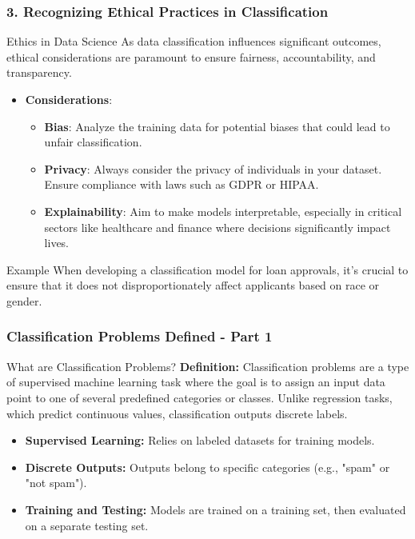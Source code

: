 \documentclass[aspectratio=169]{beamer}
\begin{document}
\begin{frame}[fragile]
    \frametitle{3. Recognizing Ethical Practices in Classification}
    \begin{block}{Ethics in Data Science}
        As data classification influences significant outcomes, ethical considerations are paramount to ensure fairness, accountability, and transparency.
    \end{block}
    
    \begin{itemize}
        \item \textbf{Considerations}:
        \begin{itemize}
            \item \textbf{Bias}: Analyze the training data for potential biases that could lead to unfair classification.
            \item \textbf{Privacy}: Always consider the privacy of individuals in your dataset. Ensure compliance with laws such as GDPR or HIPAA.
            \item \textbf{Explainability}: Aim to make models interpretable, especially in critical sectors like healthcare and finance where decisions significantly impact lives.
        \end{itemize}
    \end{itemize}

    \begin{block}{Example}
        When developing a classification model for loan approvals, it’s crucial to ensure that it does not disproportionately affect applicants based on race or gender.
    \end{block}
\end{frame}

\begin{frame}[fragile]
    \frametitle{Classification Problems Defined - Part 1}
    \begin{block}{What are Classification Problems?}
        \textbf{Definition:} Classification problems are a type of supervised machine learning task where the goal is to assign an input data point to one of several predefined categories or classes. Unlike regression tasks, which predict continuous values, classification outputs discrete labels.
    \end{block}

    \begin{itemize}
        \item \textbf{Supervised Learning:} Relies on labeled datasets for training models.
        \item \textbf{Discrete Outputs:} Outputs belong to specific categories (e.g., "spam" or "not spam").
        \item \textbf{Training and Testing:} Models are trained on a training set, then evaluated on a separate testing set.
    \end{itemize}
\end{frame}
\end{document}
